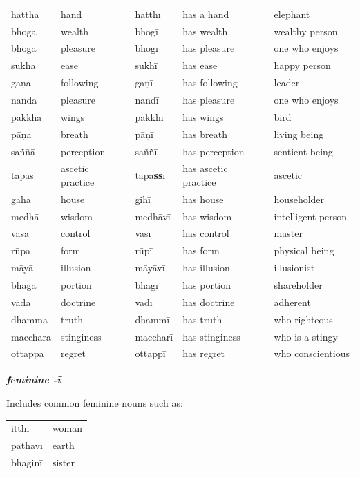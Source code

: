 \documentclass[11pt,oneside]{memoir}
\begin{document}
\begin{center}
\begin{tabular}{lllll}
hattha & hand & hatthī & has a hand & elephant\\
bhoga & wealth & bhogī & has wealth & wealthy person\\
bhoga & pleasure & bhogī & has pleasure & one who enjoys\\
sukha & ease & sukhī & has ease & happy person\\
gaṇa & following & gaṇī & has following & leader\\
nanda & pleasure & nandī & has pleasure & one who enjoys\\
pakkha & wings & pakkhī & has wings & bird\\
pāṇa & breath & pāṇī & has breath & living being\\
saññā & perception & saññī & has perception & sentient being\\
tapas & ascetic practice & tapa\textbf{ss}ī & has ascetic practice & ascetic\\
gaha & house & gihī & has house & householder\\
medhā & wisdom & medhāvī & has wisdom & intelligent person\\
vasa & control & vasī & has control & master\\
rūpa & form & rūpī & has form & physical being\\
māyā & illusion & māyāvī & has illusion & illusionist\\
bhāga & portion & bhāgī & has portion & shareholder\\
vāda & doctrine & vādī & has doctrine & adherent\\
dhamma & truth & dhammī & has truth & who righteous\\
macchara & stinginess & maccharī & has stinginess & who is a stingy\\
ottappa & regret & ottappī & has regret & who conscientious\\
\end{tabular}
\end{center}

{\centering\textit{\textbf{feminine -ī}}\par}

Includes common feminine nouns such as:

\begin{center}
\begin{tabular}{ll}
itthī & woman\\
pathavī & earth\\
bhaginī & sister\\
\end{tabular}
\end{center}
\end{document}
